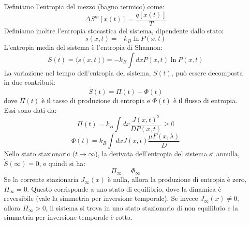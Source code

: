 Definiamo l'entropia del mezzo (bagno termico) come:
\begin{equation}
 \Delta S^m [x(t)] = \frac{q[x(t)]}{T}
\end{equation}
Definiamo inoltre l'entropia stocastica del sistema, dipendente dallo stato:
\begin{equation}
 s(x,t) = -k_B \ln P(x,t)
\end{equation}
L'entropia media del sistema è l'entropia di Shannon:
\begin{equation}
 S(t) = \langle s(x,t) \rangle = -k_B \int dx P(x,t) \ln P(x,t)
\end{equation}
La variazione nel tempo dell'entropia del sistema, $\dot{S}(t)$, può essere decomposta in due contributi:
\begin{equation}
 \dot{S}(t) = \Pi(t) - \Phi(t)
\end{equation}
dove $\Pi(t)$ è il tasso di produzione di entropia e $\Phi(t)$ è il flusso di entropia. Essi sono dati da:
\begin{equation}
 \Pi(t) = k_B \int dx \frac{J(x,t)^2}{D P(x,t)} \ge 0
\end{equation}
\begin{equation}
 \Phi(t) = k_B \int dx J(x,t) \frac{\mu F(x,\lambda)}{D}
\end{equation}
Nello stato stazionario ($t \rightarrow \infty$), la derivata dell'entropia del sistema si annulla, $\dot{S}(\infty)=0$, e quindi si ha:
\begin{equation}
 \Pi_\infty = \Phi_\infty
\end{equation}
Se la corrente stazionaria $J_\infty(x)$ è nulla, allora la produzione di entropia è zero, $\Pi_\infty=0$. Questo corrisponde a uno stato di equilibrio, dove la dinamica è reversibile (vale la simmetria per inversione temporale). Se invece $J_\infty(x) \neq 0$, allora $\Pi_\infty > 0$, il sistema si trova in uno stato stazionario di non equilibrio e la simmetria per inversione temporale è rotta.

